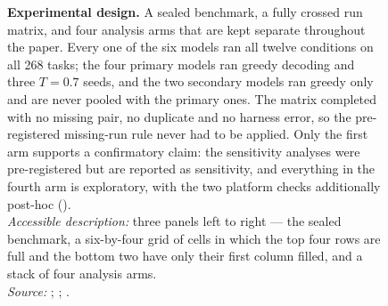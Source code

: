 \begin{figure}[t]

\vspace{1mm}
\caption[Experimental design]{%
\textbf{Experimental design.} A sealed benchmark, a fully crossed run matrix, and four analysis arms that are kept
separate throughout the paper. Every one of the six models ran all twelve conditions on all 268 tasks; the four
primary models ran greedy decoding and three $T=0.7$ seeds, and the two secondary models ran greedy only and are
never pooled with the primary ones. The matrix completed with no missing pair, no duplicate and no harness error,
so the pre-registered missing-run rule never had to be applied. Only the first arm supports a confirmatory claim:
the sensitivity analyses were pre-registered but are reported as sensitivity, and everything in the fourth arm is
exploratory, with the two platform checks additionally post-hoc ().\\
\emph{Accessible description:} three panels left to right --- the sealed benchmark, a six-by-four grid of cells in
which the top four rows are full and the bottom two have only their first column filled, and a stack of four
analysis arms.\\
\emph{Source:} ; ;
.}
\label{fig:design}
\end{figure}

